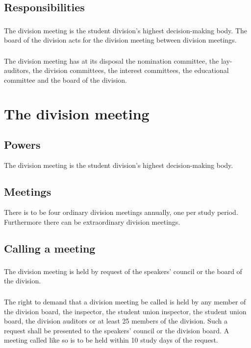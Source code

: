 \documentclass[a4paper]{dtek}
\begin{document}
\subsection{Responsibilities}
\subsubsection{}
The division meeting is the student division's highest decision-making body. 
The board of the division acts for the division meeting between division meetings. 

\subsubsection{}
The division meeting has at its disposal the nomination committee, the lay-auditors, the division committees, the interest committees, the educational committee and the board of the division. 

\newpage

\section{The division meeting}
\subsection{Powers}
The division meeting is the student division's highest decision-making body.
\subsection{Meetings}
There is to be four ordinary division meetings annually, one per study period. Furthermore there can be extraordinary division meetings. 

\subsection{Calling a meeting}
\subsubsection{}
The division meeting is held by request of the speakers' council or the board of the division. 

\subsubsection{}
The right to demand that a division meeting be called is held by any member of the division board, the inspector, the student union inspector, the student union board, the division auditors or at least 25 members of the division. Such a request shall be presented to the speakers' council or the division board. A meeting called like so is to be held within 10 study days of the request. 
\end{document}
